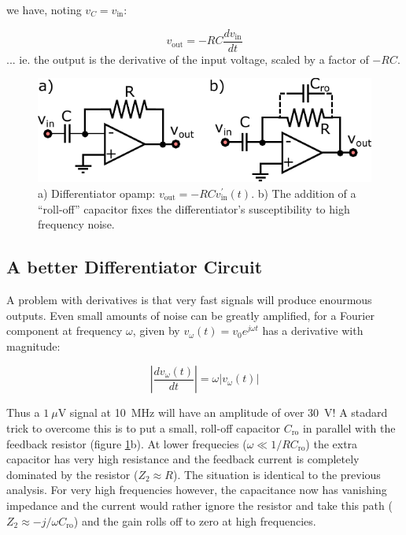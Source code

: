 \documentclass{tufte-book}
\begin{document}
we have, noting $v_C = v_\text{in}$:

\begin{equation}
\label{eq:opamp_differentiator}
v_\text{out} = -RC\frac{dv_\text{in}}{dt}
\end{equation}
\noindent ... ie. the output is the derivative of the input voltage, scaled by a factor of $-RC$.

\begin{figure}[ht]
\caption{a) Differentiator opamp: $v_\text{out} = -RCv_\text{in}^\prime(t)$. b) The addition of a ``roll-off'' capacitor fixes the differentiator's susceptibility to high frequency noise.}
\label{fig:differentiator_opamp}
	\begin{center}
		\includegraphics[]{Images/differentiator_opamp.pdf}
	\end{center}
\end{figure}
\subsection{A better Differentiator Circuit}
A problem with derivatives is that very fast signals will produce enourmous outputs. Even small amounts of noise can be greatly amplified, for a Fourier component at frequency $\omega$, given by $v_\omega(t) = v_0e^{j\omega t}$ has a derivative with magnitude:

$$
\left\vert\frac{dv_\omega(t)}{dt}\right\vert = \omega \vert v_\omega(t)\vert
$$

Thus a $1~\mu$V signal at 10~MHz will have an amplitude of over 30~V! A stadard trick to overcome this is to put a small, roll-off capacitor $C_\text{ro}$ in parallel with the feedback resistor (figure \ref{fig:differentiator_opamp}b). At lower frequecies ($\omega \ll 1/RC_\text{ro}$) the extra capacitor has very high resistance and the feedback current is completely dominated by the resistor ($Z_2 \approx R$). The situation is identical to the previous analysis. For very high frequencies however, the capacitance now has vanishing impedance and the current would rather ignore the resistor and take this path ($Z_2\approx -j/\omega C_\text{ro}$) and the gain rolls off to zero at high frequencies.
\end{document}
